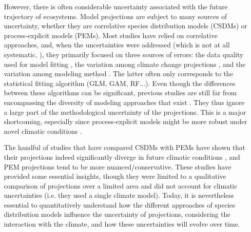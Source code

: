 \documentclass[letterpaper,8pt]{extarticle}  %
\begin{document}
\begin{doublespacing}
\begin{linenumbers}
However, there is often considerable uncertainty associated with the future trajectory of ecosystems. Model projections are subject to many sources of uncertainty, whether they are correlative species distribution models (CSDMs) or process-explicit models (PEMs). Most studies have relied on correlative approaches, and, when the uncertainties were addressed (which is not at all systematic, \citealp{Simmonds2024}), they primarily focused on three sources of errors: the data quality used for model fitting \citep{Chen2013, BarbetMassin2010, Duputie2014, Faurby2018}, the variation among climate change projections \citep{Beaumont2007, DinizFilho2009, Thuiller2019}, and the variation among modeling method \citep{Pearson2006, DinizFilho2009, Thuiller2019}. The latter often only corresponds to the statistical fitting algorithm (GLM, GAM, RF...). Even though the differences between these algorithms can be significant, previous studies are still far from encompassing the diversity of modeling approaches that exist \citep{Dormann2012}. They thus ignore a large part of the methodological uncertainty of the projections. This is a major shortcoming, especially since process-explicit models might be more robust under novel climatic conditions \citep{VanderMeersch2024}.

The handful of studies that have compared CSDMs with PEMs have shown that their projections indeed significantly diverge in future climatic conditions \citep{Morin2009, Keenan2011, Cheaib2012, Takolander2019}, and PEM projections tend to be more nuanced/conservative. These studies have provided some essential insights, though they were limited to a qualitative comparison of projections over a limited area and did not account for climatic uncertainties (i.e. they used a single climate model). Today, it is nevertheless essential to quantitatively understand how the different approaches of species distribution models influence the uncertainty of projections, considering the interaction with the climate, and how these uncertainties will evolve over time.


\end{linenumbers}
\end{doublespacing}
\end{document}
